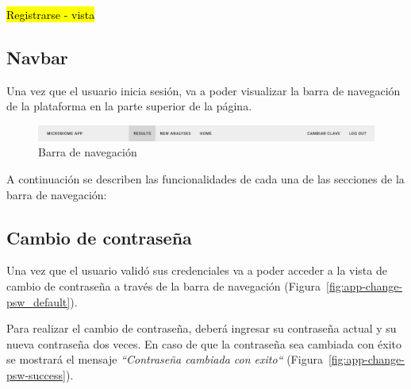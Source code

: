 \hl{Registrarse - vista}
\subsection{Navbar}
Una vez que el usuario inicia sesión, va a poder visualizar la barra de navegación de la plataforma en la parte superior de la página. 
\begin{figure}[H]
    \includegraphics[width=1\linewidth]{images/app/navbar.png}
    \caption{Barra de navegación}
    \label{fig:app-nabvar}
\end{figure}

A continuación se describen las funcionalidades de cada una de las secciones de la barra de navegación:

\subsection{Cambio de contraseña}
Una vez que el usuario validó sus credenciales va a poder acceder a la vista de cambio de contraseña a través de la barra de navegación (Figura~\ref{fig:app-change-psw_default}).



Para realizar el cambio de contraseña, deberá ingresar su contraseña actual y su nueva contraseña dos veces.
En caso de que la contraseña sea cambiada con éxito se mostrará el mensaje \textit{“Contraseña cambiada con exito“} (Figura~\ref{fig:app-change-psw-success}).


